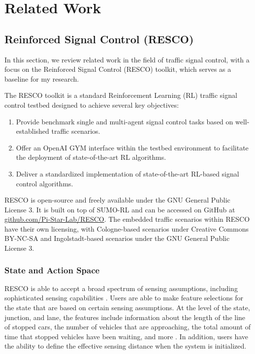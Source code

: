\chapter{Related Work}
\section{Reinforced Signal Control (RESCO)}
In this section, we review related work in the field of traffic signal control, with a focus on the Reinforced Signal Control (RESCO) toolkit, which serves as a baseline for my research.

The RESCO toolkit is a standard Reinforcement Learning (RL) traffic signal control testbed designed to achieve several key objectives:

\begin{enumerate}
    \item Provide benchmark single and multi-agent signal control tasks based on well-established traffic scenarios.
    \item Offer an OpenAI GYM interface within the testbed environment to facilitate the deployment of state-of-the-art RL algorithms.
    \item Deliver a standardized implementation of state-of-the-art RL-based signal control algorithms.
\end{enumerate}

RESCO is open-source and freely available under the GNU General Public License 3. It is built on top of SUMO-RL \cite{alegre2019sumo-rl} and can be accessed on GitHub at \url{github.com/Pi-Star-Lab/RESCO}. The embedded traffic scenarios within RESCO have their own licensing, with Cologne-based scenarios under Creative Commons BY-NC-SA and Ingolstadt-based scenarios under the GNU General Public License 3.

\subsection{State and Action Space}

RESCO is able to accept a broad spectrum of sensing assumptions, including sophisticated sensing capabilities \cite{codeca2018monaco}. Users are able to make feature selections for the state that are based on certain sensing assumptions. At the level of the state, junction, and lane, the features include information about the length of the line of stopped cars, the number of vehicles that are approaching, the total amount of time that stopped vehicles have been waiting, and more \cite{codeca2018monaco}. In addition, users have the ability to define the effective sensing distance when the system is initialized.

